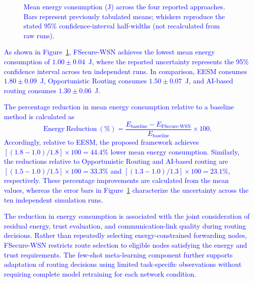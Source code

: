 \documentclass[pdflatex,sn-mathphys-num]{sn-jnl}
\newcommand{\Revised}[1]{\textcolor{blue}{#1}}
\begin{document}
\begin{figure}[!tb]
\centering
{}
\caption{\Revised{Mean energy consumption (J) across the four reported approaches. Bars represent previously tabulated means; whiskers reproduce the stated 95\% confidence-interval half-widths (not recalculated from raw runs).}}
\label{fig:energy}
\end{figure}

\textcolor{blue}{As shown in Figure~\ref{fig:energy}, FSecure-WSN achieves
the lowest mean energy consumption of $1.00\pm0.04$~J, where the reported
uncertainty represents the 95\% confidence interval across ten independent
runs. In comparison, EESM consumes $1.80\pm0.09$~J, Opportunistic Routing
consumes $1.50\pm0.07$~J, and AI-based routing consumes $1.30\pm0.06$~J.}

\textcolor{blue}{The percentage reduction in mean energy consumption
relative to a baseline method is calculated as
\begin{equation}
\mathrm{Energy~Reduction}~(\%)=
\frac{E_{\mathrm{baseline}}-E_{\mathrm{FSecure\text{-}WSN}}}
{E_{\mathrm{baseline}}}\times100.
\end{equation}
Accordingly, relative to EESM, the proposed framework achieves
$\left[(1.8-1.0)/1.8\right]\times100=44.4\%$ lower mean energy consumption.
Similarly, the reductions relative to Opportunistic Routing and AI-based
routing are $\left[(1.5-1.0)/1.5\right]\times100=33.3\%$ and
$\left[(1.3-1.0)/1.3\right]\times100=23.1\%$, respectively. These percentage
improvements are calculated from the mean values, whereas the error bars in
Figure~\ref{fig:energy} characterize the uncertainty across the ten
independent simulation runs.}

\textcolor{blue}{The reduction in energy consumption is associated with the
joint consideration of residual energy, trust evaluation, and
communication-link quality during routing decisions. Rather than repeatedly
selecting energy-constrained forwarding nodes, FSecure-WSN restricts route
selection to eligible nodes satisfying the energy and trust requirements.
The few-shot meta-learning component further supports adaptation of routing
decisions using limited task-specific observations without requiring
complete model retraining for each network condition.}
\end{document}
